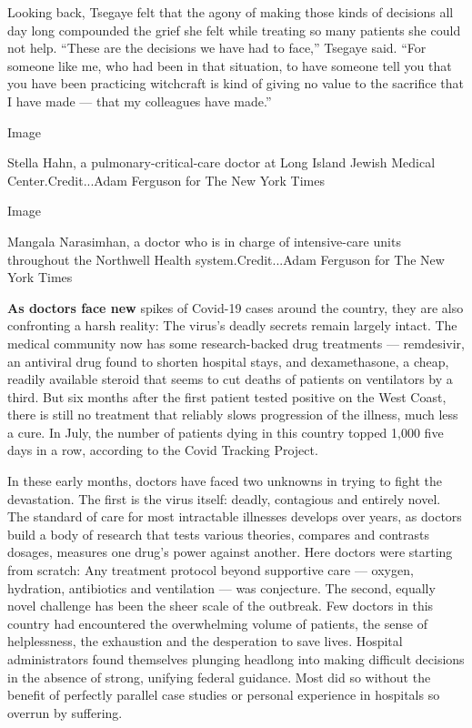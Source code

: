Looking back, Tsegaye felt that the agony of making those kinds of
decisions all day long compounded the grief she felt while treating so
many patients she could not help. ``These are the decisions we have had
to face,'' Tsegaye said. ``For someone like me, who had been in that
situation, to have someone tell you that you have been practicing
witchcraft is kind of giving no value to the sacrifice that I have made
--- that my colleagues have made.''

Image

Stella Hahn, a pulmonary-critical-care doctor at Long Island Jewish
Medical Center.Credit...Adam Ferguson for The New York Times

Image

Mangala Narasimhan, a doctor who is in charge of intensive-care units
throughout the Northwell Health system.Credit...Adam Ferguson for The
New York Times

\textbf{As doctors face new} spikes of Covid-19 cases around the
country, they are also confronting a harsh reality: The virus's deadly
secrets remain largely intact. The medical community now has some
research-backed drug treatments --- remdesivir, an antiviral drug found
to shorten hospital stays, and dexamethasone, a cheap, readily available
steroid that seems to cut deaths of patients on ventilators by a third.
But six months after the first patient tested positive on the West
Coast, there is still no treatment that reliably slows progression of
the illness, much less a cure. In July, the number of patients dying in
this country topped 1,000 five days in a row, according to the Covid
Tracking Project.

In these early months, doctors have faced two unknowns in trying to
fight the devastation. The first is the virus itself: deadly, contagious
and entirely novel. The standard of care for most intractable illnesses
develops over years, as doctors build a body of research that tests
various theories, compares and contrasts dosages, measures one drug's
power against another. Here doctors were starting from scratch: Any
treatment protocol beyond supportive care --- oxygen, hydration,
antibiotics and ventilation --- was conjecture. The second, equally
novel challenge has been the sheer scale of the outbreak. Few doctors in
this country had encountered the overwhelming volume of patients, the
sense of helplessness, the exhaustion and the desperation to save lives.
Hospital administrators found themselves plunging headlong into making
difficult decisions in the absence of strong, unifying federal guidance.
Most did so without the benefit of perfectly parallel case studies or
personal experience in hospitals so overrun by suffering.

